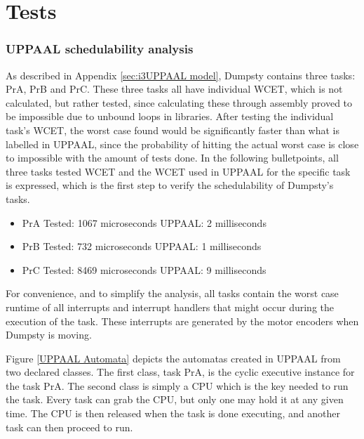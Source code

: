 \chapter{Tests}
\label{chap:Tests}

\subsection{UPPAAL schedulability analysis}
\label{sec:UPPAAL schedulability}
As described in Appendix \ref{sec:i3UPPAAL model}, Dumpsty contains three tasks: PrA, PrB and PrC. These three tasks all have individual WCET, which is not calculated, but rather tested, since calculating these through assembly proved to be impossible due to unbound loops in libraries. After testing the individual task's WCET, the worst case found would be significantly faster than what is labelled in UPPAAL, since the probability of hitting the actual worst case is close to impossible with the amount of tests done. In the following bulletpoints, all three tasks tested WCET and the WCET used in UPPAAL for the specific task is expressed, which is the first step to verify the schedulability of Dumpsty's tasks.

\begin{itemize}
	\item PrA \tab Tested: 1067 microseconds \tab UPPAAL: 2 milliseconds
	\item PrB \tab Tested: 732  microseconds \tab UPPAAL: 1 milliseconds
	\item PrC \tab	Tested: 8469 microseconds \tab UPPAAL: 9 milliseconds
\end{itemize}

For convenience, and to simplify the analysis, all tasks contain the worst case runtime of all interrupts and interrupt handlers that might occur during the execution of the task. These interrupts are generated by the motor encoders when Dumpsty is moving.

Figure \ref{UPPAAL Automata} depicts the automatas created in UPPAAL from two declared classes. The first class, task PrA, is the cyclic executive instance for the task PrA. The second class is simply a CPU which is the key needed to run the task. Every task can grab the CPU, but only one may hold it at any given time. The CPU is then released when the task is done executing, and another task can then proceed to run.


